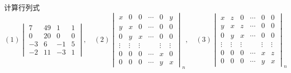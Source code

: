 \begin{example}{计算行列式}{}
    \vspace{-10pt}\[(1)\begin{vmatrix}7&49&1&1\\0&20&0&0\\-3&6&-1&5\\-2&11&-3&1\end{vmatrix},\quad(2)\begin{vmatrix}x&0&0&\cdots&0&y\\y&x&0&\cdots&0&0\\0&y&x&\cdots&0&0\\\vdots&\vdots&\vdots&&\vdots&\vdots\\0&0&0&\cdots&x&0\\0&0&0&\cdots&y&x\end{vmatrix}_n,\quad(3)\begin{vmatrix}x&z&0&\cdots&0&0\\y&x&z&\cdots&0&0\\0&y&x&\cdots&0&0\\\vdots&\vdots&\vdots&&\vdots&\vdots\\0&0&0&\cdots&x&z\\0&0&0&\cdots&y&x\end{vmatrix}_n\]
\end{example}
